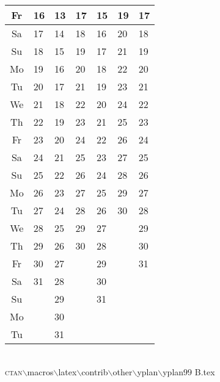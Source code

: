 \documentclass[a4paper]{article}
\newcommand{\datestrut}{\rule{0pt}{12pt}}
\begin{document}
\begin{table}
\begin{tabular}{|c||p{2.5cm}|p{2.5cm}|p{2.5cm}|p{2.5cm}|p{2.5cm}|p{2.5cm}|}
\hline
\datestrut Fr & 16  & 13 & 17  & 15&  19 & 17   \\
\hline
\datestrut Sa & 17  & 14 & 18  & 16&  20 & 18   \\
\hline
\datestrut Su & 18  & 15 & 19  & 17&  21 & 19   \\
\hline\hline
\datestrut Mo & 19  & 16 & 20  & 18&  22 & 20   \\
\hline
\datestrut Tu & 20  & 17 & 21  & 19&  23 & 21   \\
\hline
\datestrut We & 21  & 18 & 22  & 20&  24 & 22   \\
\hline
\datestrut Th & 22  & 19 & 23  & 21&  25 & 23   \\
\hline
\datestrut Fr & 23  & 20 & 24  & 22&  26 & 24   \\
\hline
\datestrut Sa & 24  & 21 & 25  & 23&  27 & 25   \\
\hline
\datestrut Su & 25  & 22 & 26  & 24&  28 & 26   \\
\hline\hline
\datestrut Mo & 26  & 23 & 27  & 25&  29 & 27   \\
\hline
\datestrut Tu & 27  & 24 & 28  & 26&  30 & 28   \\
\hline
\datestrut We & 28  & 25 & 29  & 27&     & 29   \\
\cline{1-5}\cline{7-7}
\datestrut Th & 29  & 26 & 30  & 28&     & 30   \\
\cline{1-5}\cline{7-7}
\datestrut Fr & 30  & 27 &     & 29&     & 31   \\
\cline{1-3}\cline{5-5}\cline{7-7}
\datestrut Sa & 31  & 28 &     & 30&     &      \\
\cline{1-3}\cline{5-5}
\datestrut Su &     & 29 &     & 31&     &      \\
\hline\hline
\datestrut Mo &     & 30 &     &   &     &      \\
\cline{1-1}\cline{3-3}
\datestrut Tu &     & 31 &     &   &     &       \\
\hline
\end{tabular}
{\ }    \\
\newcommand{\bs}{$\backslash$}
\textsc{ctan}{\bs}macros{\bs}latex{\bs}contrib{\bs}other{\bs}yplan{\bs}yplan99
B.tex%
\end{table}
\end{document}
